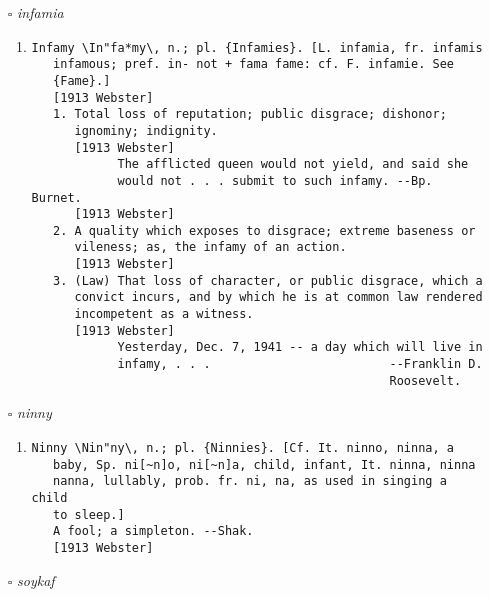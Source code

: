 \documentclass{article}
\begin{document}
\begin{itemize}
\begin{enumerate}
{\begin{lstlisting}
Petulant \Pet"u*lant\, a. [L. petulans, -antis, prop., making
   slight attacks upon, from a lost dim. of petere to fall upon,
   to attack: cf. F. p['e]tulant. See {Petition}.]
   1. Forward; pert; insolent; wanton. [Obs.] --Burton.
      [1913 Webster]
   2. Capriciously fretful; characterized by ill-natured
      freakishness; irritable. ``Petulant moods.'' --Macaulay.
      [1913 Webster]
   Syn: Irritable; ill-humored; peevish; cross; fretful;
        querulous.
        [1913 Webster]
\end{lstlisting}}
\end{enumerate}
\item[$\square$] \emph{ infamia }
\begin{enumerate}
\item{
\begin{lstlisting}
Infamy \In"fa*my\, n.; pl. {Infamies}. [L. infamia, fr. infamis
   infamous; pref. in- not + fama fame: cf. F. infamie. See
   {Fame}.]
   [1913 Webster]
   1. Total loss of reputation; public disgrace; dishonor;
      ignominy; indignity.
      [1913 Webster]
            The afflicted queen would not yield, and said she
            would not . . . submit to such infamy. --Bp. Burnet.
      [1913 Webster]
   2. A quality which exposes to disgrace; extreme baseness or
      vileness; as, the infamy of an action.
      [1913 Webster]
   3. (Law) That loss of character, or public disgrace, which a
      convict incurs, and by which he is at common law rendered
      incompetent as a witness.
      [1913 Webster]
            Yesterday, Dec. 7, 1941 -- a day which will live in
            infamy, . . .                         --Franklin D.
                                                  Roosevelt.
\end{lstlisting}}
\end{enumerate}
\item[$\square$] \emph{ ninny }
\begin{enumerate}
\item{
\begin{lstlisting}
Ninny \Nin"ny\, n.; pl. {Ninnies}. [Cf. It. ninno, ninna, a
   baby, Sp. ni[~n]o, ni[~n]a, child, infant, It. ninna, ninna
   nanna, lullably, prob. fr. ni, na, as used in singing a child
   to sleep.]
   A fool; a simpleton. --Shak.
   [1913 Webster]
\end{lstlisting}}
\end{enumerate}
\item[$\square$] \emph{ soykaf }
\begin{enumerate}

\end{enumerate}
\end{itemize}
\end{document}
